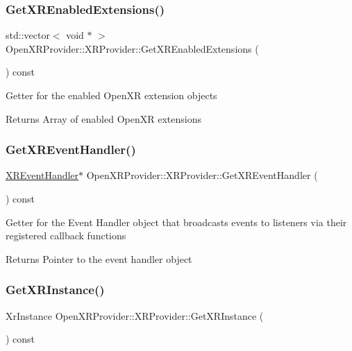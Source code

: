 \subsubsection{\texorpdfstring{GetXREnabledExtensions()}{GetXREnabledExtensions()}}
{\footnotesize\ttfamily std\+::vector$<$ void $\ast$ $>$ Open\+X\+R\+Provider\+::\+X\+R\+Provider\+::\+Get\+X\+R\+Enabled\+Extensions (\begin{DoxyParamCaption}{ }\end{DoxyParamCaption}) const\hspace{0.3cm}{\ttfamily [inline]}}

Getter for the enabled Open\+XR extension objects \begin{DoxyReturn}{Returns}
Array of enabled Open\+XR extensions 
\end{DoxyReturn}
\mbox{\label{class_open_x_r_provider_1_1_x_r_provider_a86abca051fdf068a7f4a0e4d8f57095e}} 
\subsubsection{\texorpdfstring{GetXREventHandler()}{GetXREventHandler()}}
{\footnotesize\ttfamily \mbox{\hyperlink{class_open_x_r_provider_1_1_x_r_event_handler}{X\+R\+Event\+Handler}}$\ast$ Open\+X\+R\+Provider\+::\+X\+R\+Provider\+::\+Get\+X\+R\+Event\+Handler (\begin{DoxyParamCaption}{ }\end{DoxyParamCaption}) const\hspace{0.3cm}{\ttfamily [inline]}}

Getter for the Event Handler object that broadcasts events to listeners via their registered callback functions \begin{DoxyReturn}{Returns}
Pointer to the event handler object 
\end{DoxyReturn}
\mbox{\label{class_open_x_r_provider_1_1_x_r_provider_a9e108c811e6fbb6ddd1e00e96c675fba}} 
\subsubsection{\texorpdfstring{GetXRInstance()}{GetXRInstance()}}
{\footnotesize\ttfamily Xr\+Instance Open\+X\+R\+Provider\+::\+X\+R\+Provider\+::\+Get\+X\+R\+Instance (\begin{DoxyParamCaption}{ }\end{DoxyParamCaption}) const\hspace{0.3cm}{\ttfamily [inline]}}

